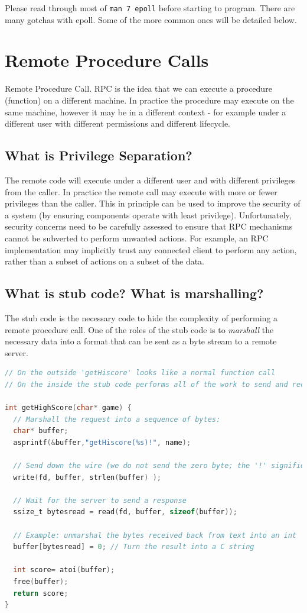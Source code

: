Please read through most of \texttt{man 7 epoll} before starting to program. There are many gotchas with epoll. Some of the more common ones will be detailed below.


\section{Remote Procedure Calls}

Remote Procedure Call.
RPC is the idea that we can execute a procedure (function) on a different machine.
In practice the procedure may execute on the same machine, however it may be in a different context - for example under a different user with different permissions and different lifecycle.

\subsection{What is Privilege Separation?}

The remote code will execute under a different user and with different privileges from the caller.
In practice the remote call may execute with more or fewer privileges than the caller.
This in principle can be used to improve the security of a system (by ensuring components operate with least privilege).
Unfortunately, security concerns need to be carefully assessed to ensure that RPC mechanisms cannot be subverted to perform unwanted actions.
For example, an RPC implementation may implicitly trust any connected client to perform any action, rather than a subset of actions on a subset of the data.

\subsection{What is stub code? What is marshalling?}

The stub code is the necessary code to hide the complexity of performing a remote procedure call.
One of the roles of the stub code is to \emph{marshall} the necessary data into a format that can be sent as a byte stream to a remote server.

\begin{lstlisting}[language=C]
// On the outside 'getHiscore' looks like a normal function call
// On the inside the stub code performs all of the work to send and receive the data to and from the remote machine.

int getHighScore(char* game) {
  // Marshall the request into a sequence of bytes:
  char* buffer;
  asprintf(&buffer,"getHiscore(%s)!", name);

  // Send down the wire (we do not send the zero byte; the '!' signifies the end of the message)
  write(fd, buffer, strlen(buffer) );

  // Wait for the server to send a response
  ssize_t bytesread = read(fd, buffer, sizeof(buffer));

  // Example: unmarshal the bytes received back from text into an int
  buffer[bytesread] = 0; // Turn the result into a C string

  int score= atoi(buffer);
  free(buffer);
  return score;
}
\end{lstlisting}

